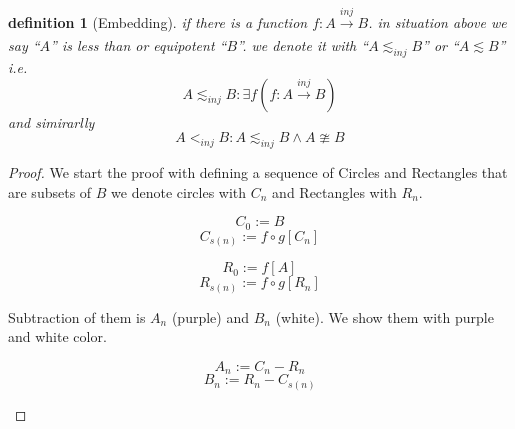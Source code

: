 \documentclass[10pt,a4paper]{book}
\newtheorem{definition}{definition}[section]
\begin{document}
\begin{definition}
    [Embedding] if there is a  function $f:A \xrightarrow[]{inj} B $.
    in  situation above we say ``$A$'' is less than or equipotent ``$B$''.   we denote it with ``$A \lesssim_{inj}  B$'' or ``$A \lesssim  B$'' i.e.
    \[ A \lesssim_{inj}  B : \exists f  (f:A \xrightarrow[]{inj} B) \]
    and simirarlly
    \[ A  <_{inj}  B : A \lesssim_{inj}  B  \land A \ncong B \]
\end{definition}



\begin{proof}

    We start the proof with defining a sequence of Circles and Rectangles 
    that are subsets of $B$ we denote circles with $C_n$ and Rectangles 
    with $R_n$.

\[
    C_0 := B
\]
\[
    C_{s(n)} := f \circ g [C_n]
\]

\[
    R_0 := f[A]
\]
\[
    R_{s(n)} := f \circ g [R_n]
\]

Subtraction of them is $A_n$ (purple) and $B_n$ (white). We show them with purple and white color.

\[
    A_n := C_n - R_n
\]
\[
    B_n := R_n - C_{s(n)}
\]




\begin{center}

    \begin{tikzpicture}[x=0.75pt,y=0.75pt,yscale=-1,xscale=1]


\end{tikzpicture}
\end{center}
\end{proof}
\end{document}
